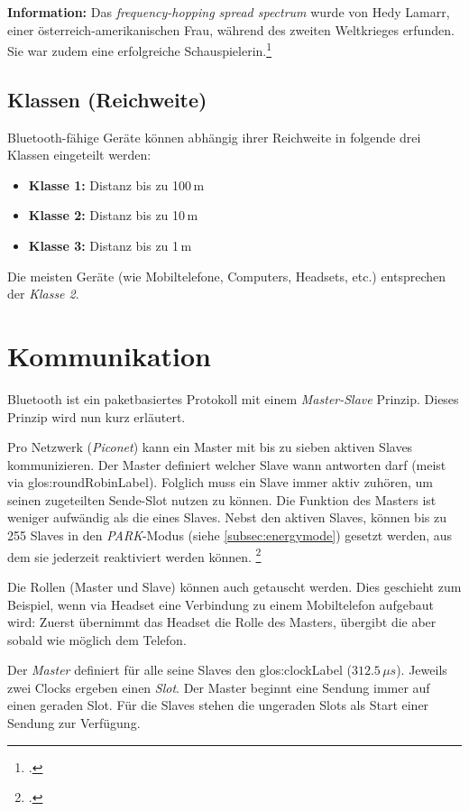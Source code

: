 \begin{framed}
	\textbf{Information:} Das \textit{frequency-hopping spread spectrum} wurde von Hedy Lamarr, einer österreich-amerikanischen Frau, während des zweiten Weltkrieges erfunden. Sie war zudem eine erfolgreiche Schauspielerin.\footcite{Hedy_Lamarr_Wikipedia_2015-04-27}
\end{framed}


\subsection{Klassen (Reichweite)}
Bluetooth-fähige Geräte können abhängig ihrer Reichweite in folgende drei Klassen eingeteilt werden:
\begin{itemize}
	\item \textbf{Klasse 1:} Distanz bis zu 100\,m
	\item \textbf{Klasse 2:} Distanz bis zu 10\,m
	\item \textbf{Klasse 3:} Distanz bis zu 1\,m
\end{itemize}
Die meisten Geräte (wie Mobiltelefone, Computers, Headsets, etc.) entsprechen der \textit{Klasse 2}.



\section{Kommunikation}
Bluetooth ist ein paketbasiertes Protokoll mit einem \textit{Master-Slave} Prinzip. Dieses Prinzip wird nun kurz erläutert.

Pro Netzwerk (\textit{Piconet}) kann ein Master mit bis zu sieben aktiven Slaves kommunizieren.
Der Master definiert welcher Slave wann antworten darf (meist via \gls{glos:roundRobinLabel}).
Folglich muss ein Slave immer aktiv zuhören, um seinen zugeteilten Sende-Slot nutzen zu können. Die Funktion des Masters ist weniger aufwändig als die eines Slaves.
Nebst den aktiven Slaves, können bis zu 255 Slaves in den \textit{PARK}-Modus (siehe \cref{subsec:energymode}) gesetzt werden, aus dem sie jederzeit reaktiviert werden können.
\footcite{Piconet_-_Wikipedia_2015-04-18}


Die Rollen (Master und Slave) können auch getauscht werden.
Dies geschieht zum Beispiel, wenn via Headset eine Verbindung zu einem Mobiltelefon aufgebaut wird:
Zuerst übernimmt das Headset die Rolle des Masters, übergibt die aber sobald wie möglich dem Telefon.

Der \textit{Master} definiert für alle seine Slaves den \gls{glos:clockLabel} ($312.5\,\mu s$).
Jeweils zwei Clocks ergeben einen \textit{Slot}.
Der Master beginnt eine Sendung immer auf einen geraden Slot.
Für die Slaves stehen die ungeraden Slots als Start einer Sendung zur Verfügung.

